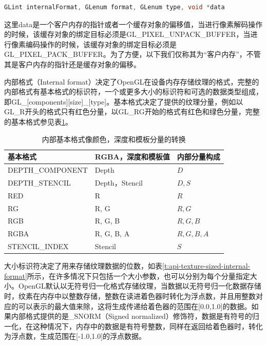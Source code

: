 \begin{lstlisting}[language=C++]
GLint internalFormat, GLenum format​, GLenum type​, void *data​
\end{lstlisting}

这里data是一个客户内存的指针或者一个缓存对象的偏移值，当进行像素解码操作的时候，该缓存对象的绑定目标必须是GL\_PIXEL\_UNPACK\_BUFFER，当进行像素编码操作的时候，该缓存对象的绑定目标必须是GL\_PIXEL\_PACK\_BUFFER。为了方便，以下我们仅称其为“客户内存”，不管其是客户内存的指针还是缓存对象的偏移。

内部格式（Internal format）决定了OpenGL在设备内存存储纹理的格式，完整的内部格式有基本格式的标识符，一个或更多大小的标识符和可选的数据类型组成，即GL\_[components][size]\_[type]。基本格式决定了提供的纹理分量，例如以GL\_R开头的格式只有红色分量，以GL\_RG开始的格式有红色和绿色分量，完整的基本格式参见表\ref{t:api-texture-base-internal-format}。

\begin{table}
\caption{内部基本格式像颜色，深度和模板分量的转换}
\label{t:api-texture-base-internal-format}
\centering
\begin{tabular}{>{\small}p{}|>{\small}p{}|>{\small}p{}}
\hline 
   基本格式 & RGBA，深度和模板值 & 内部分量构成 \\
    \hline  
  DEPTH\_COMPONENT  &Depth           &$D$\\
  DEPTH\_STENCIL    &Depth，Stencil  &$D,S$\\
  RED               &R               &$R$\\
  RG                &R, G            &$R, G$\\
  RGB               &R, G, B         &$R, G,B$\\
  RGBA              &R, G, B, A      &$R, G, B, A$\\
  STENCIL\_INDEX    &Stencil         &$S$\\

 \hline 
\end{tabular}
\end{table}

大小标识符决定了用来存储纹理数据的位数，如表\ref{t:api-texture-sized-internal-format}所示，在许多情况下只包括一个大小参数，也可以分别为每个分量指定大小。OpenGL默认以无符号归一化格式存储纹理，当数据以无符号归一化数据存储时，纹素在内存中以整数存储，整数在读进着色器时转化为浮点数，并且用整数对应的可以表示的最大值来除，这将生成传递给着色器的范围在[0.0,1.0]的数据。如果内部格式提供的是\_SNORM（Signed normalized）修饰符，数据是有符号的归一化，在这种情况下，内存中的数据是有符号整数，同样在返回给着色器时，转化为浮点数，生成范围在[-1.0,1.0]的浮点数据。


